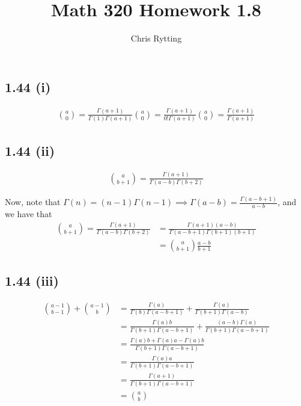 \documentclass[letterpaper,12pt]{article}
\theoremstyle{definition}
\begin{document}
\title{Math 320 Homework 1.8}
\author{Chris Rytting}
\maketitle

\subsection*{1.44 (i)}

\begin{align*}
\binom a0 = \frac{\Gamma (a+1)}{\Gamma (1) \Gamma(a + 1)}
\binom a0 = \frac{\Gamma (a+1)}{0! \Gamma(a + 1)}
\binom a0 = \frac{\Gamma (a+1)}{ \Gamma(a + 1)}
\end{align*}




\subsection*{1.44 (ii)}

\begin{align*}
\binom a{b+1} = \frac{\Gamma(a+1)}{\Gamma(a-b) \Gamma(b+2)} 
\end{align*}

Now, note that $\Gamma(n) = (n-1)\Gamma(n-1) \implies  \Gamma(a-b) = \frac{\Gamma(a-b+1)}{a-b} $, and we have that
\begin{align*}
\binom {a}{b+1} = \frac{\Gamma(a+1)}{\Gamma(a-b) \Gamma(b+2)} &=\frac{\Gamma(a+1) (a-b)}{\Gamma(a-b+1) \Gamma(b+1) (b+1)}
\\&= \binom a{b+1} \frac{a-b}{b+1}
\end{align*}

\subsection*{1.44 (iii)}

\begin{align*}
\binom {a-1}{b-1}+ \binom {a-1}b &= \frac{\Gamma(a)}{\Gamma(b) \Gamma(a-b+1)} + \frac{\Gamma(a)}{\Gamma(b+1) \Gamma(a-b)} 
\\&= \frac{\Gamma(a)b}{\Gamma(b+1) \Gamma(a-b+1)} + \frac{(a-b)\Gamma(a)}{\Gamma(b+1) \Gamma(a-b+1)} 
\\&= \frac{\Gamma(a)b + \Gamma(a)a - \Gamma(a)b}{\Gamma(b+1) \Gamma(a-b+1)} 
\\&= \frac{ \Gamma(a)a }{\Gamma(b+1) \Gamma(a-b+1)} 
\\&= \frac{ \Gamma(a+1) }{\Gamma(b+1) \Gamma(a-b+1)} 
\\&= \binom ab 
\end{align*}
\end{document}
